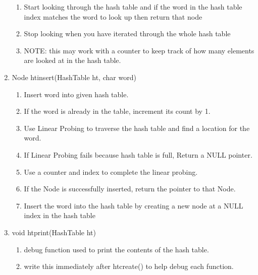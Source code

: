 \documentclass[11pt]{article}
\begin{document}
\begin{enumerate}
\begin{enumerate}
	\item Start looking through the hash table and if the word in the hash table index matches the word to look up then return that node
	\item Stop looking when you have iterated through the whole hash table
	\item NOTE: this may work with a counter to keep track of how many elements are looked at in the hash table.
	\end{enumerate}
\item Node htinsert(HashTable ht, char word)
	\begin{enumerate}
	\item Insert word into given hash table.
	\item If the word is already in the table, increment its count by 1.
	\item Use Linear Probing to traverse the hash table and find a location for the word.
	\item If Linear Probing fails because hash table is full, Return a NULL pointer.
	\item Use a counter and index to complete the linear probing.
	\item If the Node is successfully inserted, return the pointer to that Node.
	\item Insert the word into the hash table by creating a new node at a NULL index in the hash table
	\end{enumerate}
\item void htprint(HashTable ht)
	\begin{enumerate}
	\item debug function used to print the contents of the hash table.
	\item write this immediately after htcreate() to help debug each function.
	\end{enumerate}
\end{enumerate}
\end{document}
